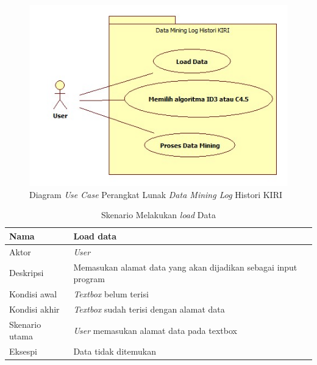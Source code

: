 \begin{figure}
\includegraphics[scale=1]{Gambar/usecase.jpg}
\caption[Diagram \textsl{Use Case} Perangkat Lunak \textsl{Data Mining Log} Histori KIRI]{Diagram \textsl{Use Case} Perangkat Lunak \textsl{Data Mining Log} Histori KIRI} 
\label{fig:diagramUseCase}
\end{figure}

\begin{table}[H]
\caption{Skenario Melakukan \textsl{load} Data}
\begin{tabular}{|l|l|}
\hline
Nama           & Load data                                                       \\ \hline
Aktor          & \textit{User}                                                   \\ \hline
Deskripsi      & Memasukan alamat data yang akan dijadikan sebagai input program \\ \hline
Kondisi awal   & \textsl{Textbox} belum terisi                                   \\ \hline
Kondisi akhir  & \textsl{Textbox} sudah terisi dengan alamat data                \\ \hline
Skenario utama & \textit{User} memasukan alamat data pada textbox                \\ \hline
Eksespi        & Data tidak ditemukan                                            \\ \hline
\end{tabular}
\end{table}

